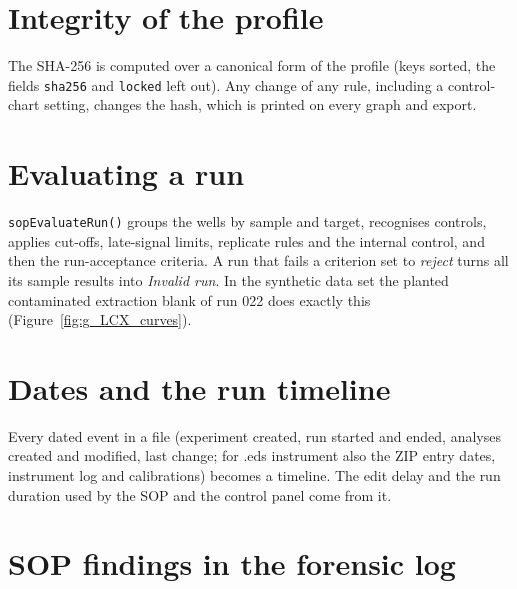 \section{Integrity of the profile}
The SHA-256 is computed over a canonical form of the profile (keys sorted, the fields \texttt{sha256} and \texttt{locked} left
out). Any change of any rule, including a control-chart setting, changes the hash, which is printed on every graph and export.





\section{Evaluating a run}
\texttt{sopEvaluateRun()} groups the wells by sample and target, recognises controls, applies cut-offs, late-signal limits,
replicate rules and the internal control, and then the run-acceptance criteria. A run that fails a criterion set to
\emph{reject} turns all its sample results into \emph{Invalid run}. In the synthetic data set the planted contaminated extraction
blank of run 022 does exactly this (Figure~\ref{fig:g_LCX_curves}).




\section{Dates and the run timeline}
Every dated event in a file (experiment created, run started and ended, analyses created and modified, last change; for
.eds instrument also the ZIP entry dates, instrument log and calibrations) becomes a timeline. The edit delay and the run duration
used by the SOP and the control panel come from it.





\section{SOP findings in the forensic log}




